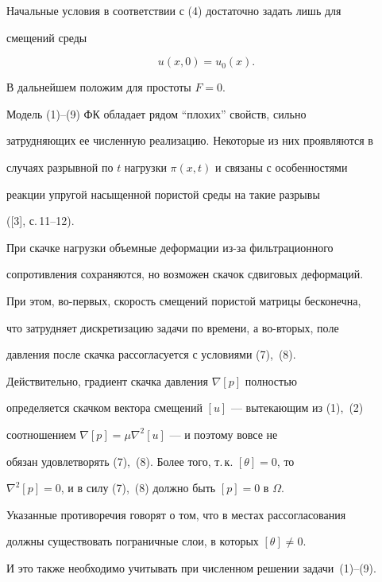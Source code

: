 Начальные условия в соответствии с (4) достаточно задать лишь для


смещений среды


\begin{equation}


u(x,0)=u_{0}(x).


\end{equation}





В дальнейшем положим для простоты $F=0$.





Модель (1)--(9) ФК обладает рядом ``плохих'' свойств, сильно


затрудняющих ее численную реализацию. Некоторые из них проявляются в


случаях разрывной по $t$ нагрузки $\pi(x,t)$ и связаны с особенностями


реакции упругой насыщенной пористой среды на такие разрывы


([3], с.\,11--12).


При скачке нагрузки объемные деформации из-за фильтрационного


сопротивления сохраняются, но возможен скачок сдвиговых деформаций.


При этом, во-первых, скорость смещений пористой матрицы бесконечна,


что затрудняет дискретизацию задачи по времени, а во-вторых, поле


давления после скачка рассогласуется с условиями (7),~(8).


Действительно, градиент скачка давления $\nabla[p]$ полностью


определяется скачком вектора смещений $[u]$ --- вытекающим из (1),~(2)


соотношением $\nabla [p] = \mu \nabla^{2} [u]$ --- и поэтому вовсе не


обязан удовлетворять (7),~(8). Более того, т.\,к. $[\theta]=0$, то


$\nabla^{2}[p]=0$, и в силу (7),~(8) должно быть $[p]=0$ в $\Omega$.


Указанные противоречия говорят о том, что в местах рассогласования


должны существовать пограничные слои, в которых $[\theta] \ne 0$.


И это также необходимо учитывать при численном решении задачи~(1)--(9).





